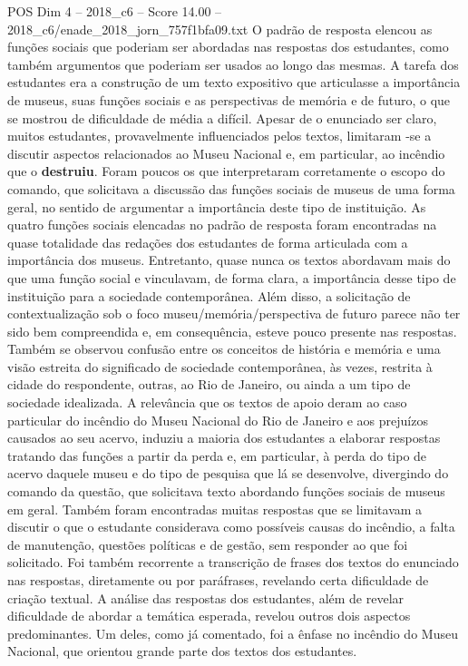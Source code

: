 \begin{textsample}{POS Dim 4 – 2018\_c6 – Score 14.00 – 2018\_c6/enade\_2018\_jorn\_757f1bfa09.txt}
O padrão de resposta elencou as funções sociais que poderiam ser abordadas nas respostas dos estudantes, como também argumentos que poderiam ser usados ao longo das mesmas.
A tarefa dos estudantes era a construção de um texto expositivo que articulasse a importância de museus, suas funções sociais e as perspectivas de memória e de futuro, o que se mostrou de dificuldade de média a difícil.
Apesar de o enunciado ser claro, muitos estudantes, provavelmente influenciados pelos textos, limitaram -se a discutir aspectos relacionados ao Museu Nacional e, em particular, ao incêndio que o \textbf{destruiu}.
Foram poucos os que interpretaram corretamente o escopo do comando, que solicitava a discussão das funções sociais de museus de uma forma geral, no sentido de argumentar a importância deste tipo de instituição.
As quatro funções sociais elencadas no padrão de resposta foram encontradas na quase totalidade das redações dos estudantes de forma articulada com a importância dos museus.
Entretanto, quase nunca os textos abordavam mais do que uma função social e vinculavam, de forma clara, a importância desse tipo de instituição para a sociedade contemporânea.
Além disso, a solicitação de contextualização sob o foco museu/memória/perspectiva de futuro parece não ter sido bem compreendida e, em consequência, esteve pouco presente nas respostas.
Também se observou confusão entre os conceitos de história e memória e uma visão estreita do significado de sociedade contemporânea, às vezes, restrita à cidade do respondente, outras, ao Rio de Janeiro, ou ainda a um tipo de sociedade idealizada.
A relevância que os textos de apoio deram ao caso particular do incêndio do Museu Nacional do Rio de Janeiro e aos prejuízos causados ao seu acervo, induziu a maioria dos estudantes a elaborar respostas tratando das funções a partir da perda e, em particular, à perda do tipo de acervo daquele museu e do tipo de pesquisa que lá se desenvolve, divergindo do comando da questão, que solicitava texto abordando funções sociais de museus em geral.
Também foram encontradas muitas respostas que se limitavam a discutir o que o estudante considerava como possíveis causas do incêndio, a falta de manutenção, questões políticas e de gestão, sem responder ao que foi solicitado.
Foi também recorrente a transcrição de frases dos textos do enunciado nas respostas, diretamente ou por paráfrases, revelando certa dificuldade de criação textual.
A análise das respostas dos estudantes, além de revelar dificuldade de abordar a temática esperada, revelou outros dois aspectos predominantes.
Um deles, como já comentado, foi a ênfase no incêndio do Museu Nacional, que orientou grande parte dos textos dos estudantes.

\end{textsample}
